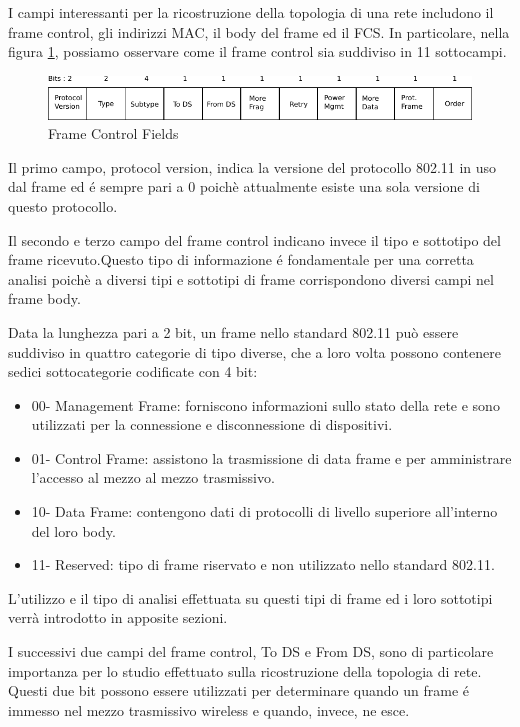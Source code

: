 I campi interessanti per la ricostruzione della topologia di una rete includono il frame control, gli indirizzi MAC, il body del frame ed il FCS.
In particolare, nella figura \ref{fig:framecontrolfields}, possiamo osservare come il frame control sia suddiviso in 11 sottocampi.

\begin{figure}[!htb]
	\centering
	\includegraphics{images/img6.pdf}
	\caption{Frame Control Fields}
	\label{fig:framecontrolfields}
\end{figure}

Il primo campo, protocol version, indica la versione del protocollo 802.11 in uso dal frame ed \'e sempre pari a 0 poich\`e attualmente esiste una sola versione di questo protocollo.

Il secondo e terzo campo del frame control indicano invece il tipo e sottotipo del frame ricevuto.Questo tipo di informazione \'e fondamentale per una corretta analisi poich\`e a diversi tipi e sottotipi di frame corrispondono diversi campi nel frame body.

Data la lunghezza pari a 2 bit, un frame nello standard 802.11 pu\`o essere suddiviso in quattro categorie di tipo diverse, che a loro volta possono contenere sedici sottocategorie codificate con 4 bit:
\begin{itemize}
	\item 00- Management Frame: forniscono informazioni sullo stato della rete e sono utilizzati per la connessione e disconnessione di dispositivi.
	\item 01- Control Frame: assistono la trasmissione di data frame e per amministrare l'accesso al mezzo al mezzo trasmissivo.
	\item 10- Data Frame: contengono dati di protocolli di livello superiore all'interno del loro body.
	\item 11- Reserved: tipo di frame riservato e non utilizzato nello standard 802.11.
\end{itemize}

L'utilizzo e il tipo di analisi effettuata su questi tipi di frame ed i loro sottotipi verr\`a introdotto in apposite sezioni.

I successivi due campi del frame control, To DS e From DS, sono di particolare importanza per lo studio effettuato sulla ricostruzione della topologia di rete.
Questi due bit possono essere utilizzati per determinare quando un frame \'e immesso nel mezzo trasmissivo wireless e quando, invece, ne esce.

